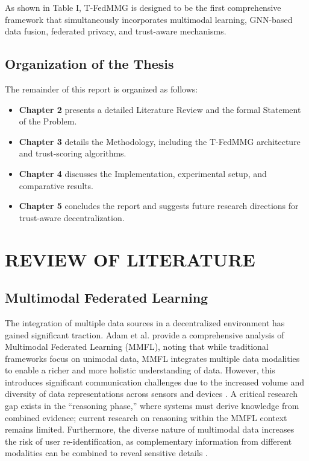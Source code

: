\documentclass[12pt,a4paper]{report}
\begin{document}
{As shown in Table I, T-FedMMG is designed to be the first comprehensive framework that simultaneously incorporates multimodal learning, GNN-based data fusion, federated privacy, and trust-aware mechanisms.

\section{Organization of the Thesis}
The remainder of this report is organized as follows:
\begin{itemize}
    \item \textbf{Chapter 2} presents a detailed Literature Review and the formal Statement of the Problem.
    \item \textbf{Chapter 3} details the Methodology, including the T-FedMMG architecture and trust-scoring algorithms.
    \item \textbf{Chapter 4} discusses the Implementation, experimental setup, and comparative results.
    \item \textbf{Chapter 5} concludes the report and suggests future research directions for trust-aware decentralization.
\end{itemize}
\chapter{REVIEW OF LITERATURE}

\section{Multimodal Federated Learning}
The integration of multiple data sources in a decentralized environment has gained significant traction. Adam et al. \cite{b1} provide a comprehensive analysis of Multimodal Federated Learning (MMFL), noting that while traditional frameworks focus on unimodal data, MMFL integrates multiple data modalities to enable a richer and more holistic understanding of data. However, this introduces significant communication challenges due to the increased volume and diversity of data representations across sensors and devices \cite{b1}. A critical research gap exists in the ``reasoning phase,'' where systems must derive knowledge from combined evidence; current research on reasoning within the MMFL context remains limited. Furthermore, the diverse nature of multimodal data increases the risk of user re-identification, as complementary information from different modalities can be combined to reveal sensitive details \cite{b1}.

}
\end{document}
